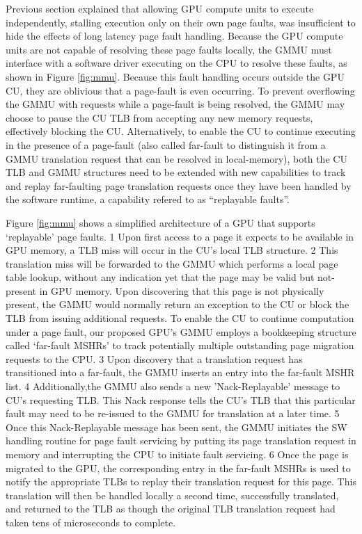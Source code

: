 Previous section explained that allowing GPU compute units to execute independently, stalling execution only on their own page faults, was insufficient to hide the effects of long latency page fault handling. Because the GPU compute units are not capable of resolving these page faults locally, the GMMU must interface with a software driver executing on the CPU to resolve these faults, as shown in Figure \ref{fig:mmu}. Because this fault handling occurs outside the GPU CU, they are oblivious that a page-fault is even occurring. To prevent overflowing the GMMU with requests while a page-fault is being resolved, the GMMU may choose to pause the CU TLB from accepting any new memory requests, effectively blocking the CU. Alternatively, to enable the CU to continue executing in the presence of a page-fault (also called far-fault to distinguish it from a GMMU translation request that can be resolved in local-memory), both the CU TLB and GMMU structures need to be extended with new capabilities to track and replay far-faulting page translation requests once they have been handled by the software runtime, a capability refered to as “replayable faults”. 

Figure \ref{fig:mmu} shows a simplified architecture of a GPU that supports ‘replayable’ page faults. \textcircled{\small{1}} Upon first access to a page it expects to be available in GPU memory, a TLB miss will occur in the CU’s local TLB structure. \textcircled{\small{2}} This translation miss will be forwarded to the GMMU which performs a local page table lookup, without any indication yet that the page may be valid but not-present in GPU memory. Upon discovering that this page is not physically present, the GMMU would normally return an exception to the CU or block the TLB from issuing additional requests. To enable the CU to continue computation under a page fault, our proposed GPU’s GMMU employs a bookkeeping structure called ‘far-fault MSHRs’ to track potentially multiple outstanding page migration requests to the CPU. \textcircled{\small{3}} Upon discovery that a translation request has transitioned into a far-fault, the GMMU inserts an entry into the far-fault MSHR list. \textcircled{\small{4}} Additionally,the GMMU also sends a new ’Nack-Replayable’ message to CU’s requesting TLB. This Nack response tells the CU’s TLB that this particular fault may need to be re-issued to the GMMU for translation at a later time. \textcircled{\small{5}} Once this Nack-Replayable message has been sent, the GMMU initiates the SW handling routine for page fault servicing by putting its page translation request in memory and interrupting the CPU to initiate fault servicing. \textcircled{\small{6}} Once the page is migrated to the GPU, the corresponding entry in the far-fault MSHRs is used to notify the appropriate TLBs to replay their translation request for this page. This translation will then be handled locally a second time, successfully translated, and returned to the TLB as though the original TLB translation request had taken tens of microseconds to complete.

